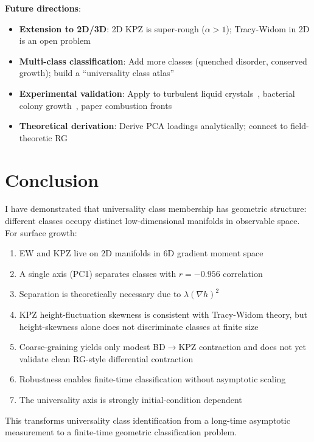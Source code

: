 \documentclass[aps,pre,twocolumn,superscriptaddress,showpacs]{revtex4-2}
\begin{document}
\textbf{Future directions}:
\begin{itemize}
\item \textbf{Extension to 2D/3D}: 2D KPZ is super-rough ($\alpha > 1$); Tracy-Widom in 2D is an open problem
\item \textbf{Multi-class classification}: Add more classes (quenched disorder, conserved growth); build a ``universality class atlas''
\item \textbf{Experimental validation}: Apply to turbulent liquid crystals~\cite{Takeuchi2010}, bacterial colony growth~\cite{Hallatschek2007}, paper combustion fronts~\cite{Myllys2001}
\item \textbf{Theoretical derivation}: Derive PCA loadings analytically; connect to field-theoretic RG
\end{itemize}

\section{Conclusion}
\label{sec:conclusion}

I have demonstrated that universality class membership has geometric structure: different classes occupy distinct low-dimensional manifolds in observable space. For surface growth:
\begin{enumerate}
\item EW and KPZ live on 2D manifolds in 6D gradient moment space
\item A single axis (PC1) separates classes with $r = -0.956$ correlation
\item Separation is theoretically necessary due to $\lambda(\nabla h)^2$
\item KPZ height-fluctuation skewness is consistent with Tracy-Widom theory, but height-skewness alone does not discriminate classes at finite size
\item Coarse-graining yields only modest BD$\to$KPZ contraction and does not yet validate clean RG-style differential contraction
\item Robustness enables finite-time classification without asymptotic scaling
\item The universality axis is strongly initial-condition dependent
\end{enumerate}

This transforms universality class identification from a long-time asymptotic measurement to a finite-time geometric classification problem.
\end{document}
